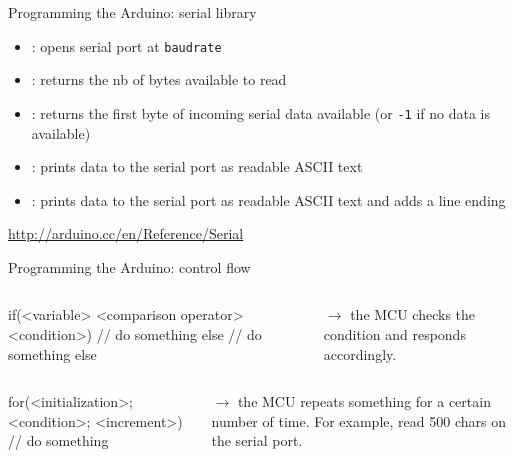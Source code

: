 \documentclass[compress]{beamer}
\begin{document}
\begin{frame}{Programming the Arduino: serial library}
    \begin{itemize}
        \item {}: opens serial port at
            \texttt{baudrate}
        \item {}: returns the nb of bytes available to
            read
        \item {}: returns the first byte of incoming serial
            data available (or \texttt{-1} if no data is available)
        \item {}: prints data to the serial
            port as readable ASCII text
         \item {}: prints data to the serial
            port as readable ASCII text and adds a line ending
            
    \end{itemize}

    \url{http://arduino.cc/en/Reference/Serial}
\end{frame}

\begin{frame}[fragile]{Programming the Arduino: control flow}

\begin{columns}
    \begin{column}{0.5\linewidth}
        \begin{cppcode}
if(<variable> <comparison operator> <condition>)
{
    // do something
}
else
{
    // do something else
}
        \end{cppcode}
    \end{column}
    \begin{column}{0.5\linewidth}
        \vspace{1em}

        $\rightarrow$ the MCU checks the condition and responds accordingly.

    \end{column}
\end{columns}

\begin{columns}
    \begin{column}{0.5\linewidth}
         \begin{cppcode}
for(<initialization>; <condition>; <increment>)
{
    // do something
}
        \end{cppcode}
    \end{column}
    \begin{column}{0.5\linewidth}
        \vspace{4em}

        $\rightarrow$ the MCU repeats something for a certain number of time.
        For example, read 500 chars on the serial port.

    \end{column}
\end{columns}
\end{frame}
\end{document}
